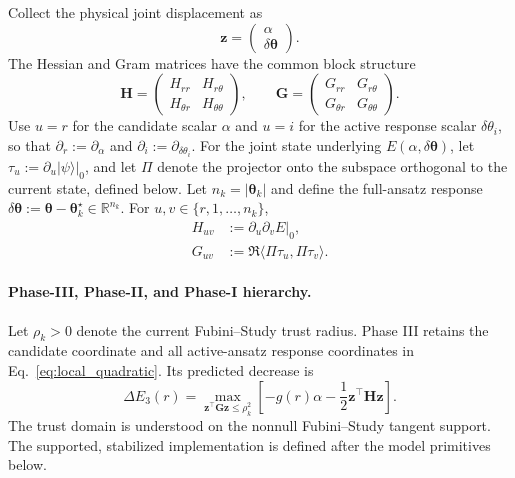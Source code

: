 \documentclass[
  reprint,
  amsmath,
  amssymb,
  aps,
  pra,
  nofootinbib,
  superscriptaddress,
  floatfix
]{revtex4-2}
\newcommand{\ket}[1]{|#1\rangle}
\begin{document}
Collect the physical joint displacement as
\begin{equation*}
\mathbf z=
\begin{pmatrix}
\alpha\\
\delta\boldsymbol\theta
\end{pmatrix}.
\end{equation*}
The Hessian and Gram matrices have the common block structure
\begin{equation*}
\mathbf H=
\begin{pmatrix}
H_{rr} & H_{r\theta}\\
H_{\theta r} & H_{\theta\theta}
\end{pmatrix},
\qquad
\mathbf G=
\begin{pmatrix}
G_{rr} & G_{r\theta}\\
G_{\theta r} & G_{\theta\theta}
\end{pmatrix}.
\end{equation*}
Use \(u=r\) for the candidate scalar \(\alpha\) and \(u=i\) for the active
response scalar \(\delta\theta_i\), so that
\(\partial_r:=\partial_\alpha\) and
\(\partial_i:=\partial_{\delta\theta_i}\). For the joint state underlying
\(E(\alpha,\delta\boldsymbol\theta)\), let
\(\tau_u:=\left.\partial_u\ket{\psi}\right|_0\), and let \(\Pi\) denote the
projector onto the subspace orthogonal to the current state, defined below. Let \(n_k=|\boldsymbol\theta_k|\) and define the full-ansatz response
\(\delta\boldsymbol\theta:=\boldsymbol\theta-\boldsymbol\theta_k^\star
\in\mathbb R^{n_k}\). 
For \(u,v\in\{r,1,\ldots,n_k\}\),
\begin{equation}
\begin{aligned}
H_{uv}&:=\left.\partial_u\partial_vE\right|_0,\\
G_{uv}&:=\Re\langle\Pi\tau_u,\Pi\tau_v\rangle.
\end{aligned}
\label{eq:joint_response_entries}
\end{equation}

\paragraph*{Phase-III, Phase-II, and Phase-I hierarchy.}
%
Let \(\rho_k>0\) denote the current Fubini--Study trust radius. Phase III
retains the candidate coordinate and
all active-ansatz response coordinates in Eq.~\eqref{eq:local_quadratic}. Its
predicted decrease is
\begin{equation}
\Delta E_3(r)
=\max_{\mathbf z^{\top}\mathbf G\mathbf z\le\rho_k^2}
\left[
-g(r)\alpha
-\frac12\mathbf z^{\top}\mathbf H\mathbf z
\right].
\label{eq:phase3_model}
\end{equation}
The trust domain is understood on the nonnull Fubini--Study tangent support.
The supported, stabilized implementation is defined after the model primitives
below.
\end{document}
